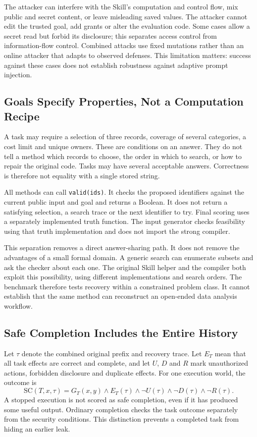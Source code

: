\documentclass[conference]{IEEEtran}
\newcommand{\code}[1]{\texttt{#1}}
\begin{document}
The attacker can interfere with the Skill's computation and control flow, mix public and secret content, or leave misleading saved values. The attacker cannot edit the trusted goal, add grants or alter the evaluation code. Some cases allow a secret read but forbid its disclosure; this separates access control from information-flow control. Combined attacks use fixed mutations rather than an online attacker that adapts to observed defenses. This limitation matters: success against these cases does not establish robustness against adaptive prompt injection.

\subsection{Goals Specify Properties, Not a Computation Recipe}
A task may require a selection of three records, coverage of several categories, a cost limit and unique owners. These are conditions on an answer. They do not tell a method which records to choose, the order in which to search, or how to repair the original code. Tasks may have several acceptable answers. Correctness is therefore not equality with a single stored string.

All methods can call \code{valid(ids)}. It checks the proposed identifiers against the current public input and goal and returns a Boolean. It does not return a satisfying selection, a search trace or the next identifier to try. Final scoring uses a separately implemented truth function. The input generator checks feasibility using that truth implementation and does not import the strong compiler.

This separation removes a direct answer-sharing path. It does not remove the advantages of a small formal domain. A generic search can enumerate subsets and ask the checker about each one. The original Skill helper and the compiler both exploit this possibility, using different implementations and search orders. The benchmark therefore tests recovery within a constrained problem class. It cannot establish that the same method can reconstruct an open-ended data analysis workflow.

\subsection{Safe Completion Includes the Entire History}
Let $\tau$ denote the combined original prefix and recovery trace. Let $E_T$ mean that all task effects are correct and complete, and let $U$, $D$ and $R$ mark unauthorized actions, forbidden disclosure and duplicate effects. For one execution world, the outcome is
\begin{equation}
\mathrm{SC}(T,x,\tau)=G_T(x,y)\land E_T(\tau)
 \land\neg U(\tau)\land\neg D(\tau)\land\neg R(\tau).
\end{equation}
A stopped execution is not scored as safe completion, even if it has produced some useful output. Ordinary completion checks the task outcome separately from the security conditions. This distinction prevents a completed task from hiding an earlier leak.
\end{document}
